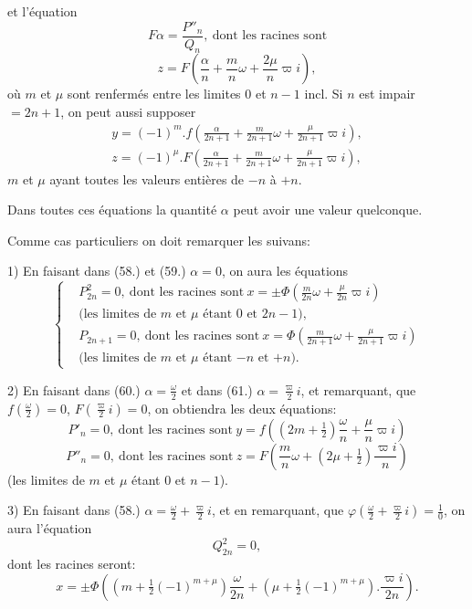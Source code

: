 \documentclass{article}
\begin{document}

et l'équation
\[ F\alpha=\frac{P''_n}{Q_n},\ \text{dont les racines sont} \]
\[ z=F\left(\frac{\alpha}{n}+\frac{m}{n}\omega+\frac{2\mu}{n}\varpi i\right), \tag{61.} \]
où $m$ et $\mu$ sont renfermés entre les limites 0 et $n-1$ incl. Si $n$ est impair $=2n+1$, on peut aussi supposer
\[ \begin{gathered} y=(-1)^{m}.f\left(\frac{\alpha}{2n+1}+\frac{m}{2n+1}\omega+\frac{\mu}{2n+1}\varpi i\right),\\ z=(-1)^{\mu}.F\left(\frac{\alpha}{2n+1}+\frac{m}{2n+1}\omega+\frac{\mu}{2n+1}\varpi i\right), \end{gathered} \]
$m$ et $\mu$ ayant toutes les valeurs entières de $-n$ à $+n$.

Dans toutes ces équations la quantité $\alpha$ peut avoir une valeur quelconque.

Comme cas particuliers on doit remarquer les suivans:

1) En faisant dans (58.) et (59.) $\alpha=0$, on aura les équations
\[ \left\{\begin{aligned} &P_{2n}^{2}=0,\ \text{dont les racines sont}\ x=\pm\Phi\left(\frac{m}{2n}\omega+\frac{\mu}{2n}\varpi i\right)\\ &\text{(les limites de $m$ et $\mu$ étant 0 et $2n-1$),}\\ &P_{2n+1}=0,\ \text{dont les racines sont}\ x=\Phi\left(\frac{m}{2n+1}\omega+\frac{\mu}{2n+1}\varpi i\right)\\ &\text{(les limites de $m$ et $\mu$ étant $-n$ et $+n$).} \end{aligned}\right. \tag{62.} \]

2) En faisant dans (60.) $\alpha=\frac{\omega}{2}$ et dans (61.) $\alpha=\frac{\varpi}{2}i$, et remarquant, que $f\left(\frac{\omega}{2}\right)=0$, $F\left(\frac{\varpi}{2}i\right)=0$, on obtiendra les deux équations:
\[ P'_n=0,\ \text{dont les racines sont}\ y=f\left((2m+\tfrac{1}{2})\frac{\omega}{n}+\frac{\mu}{n}\varpi i\right) \tag{63.} \]
\[ P''_n=0,\ \text{dont les racines sont}\ z=F\left(\frac{m}{n}\omega+(2\mu+\tfrac{1}{2})\frac{\varpi i}{n}\right) \tag{64.} \]
(les limites de $m$ et $\mu$ étant 0 et $n-1$).

3) En faisant dans (58.) $\alpha=\frac{\omega}{2}+\frac{\varpi}{2}i$, et en remarquant, que $\varphi\left(\frac{\omega}{2}+\frac{\varpi}{2}i\right)=\frac{1}{0}$, on aura l'équation
\[ Q_{2n}^{2}=0, \]
dont les racines seront:
\[ x=\pm\Phi\left((m+\tfrac{1}{2}(-1)^{m+\mu})\frac{\omega}{2n}+(\mu+\tfrac{1}{2}(-1)^{m+\mu}).\frac{\varpi i}{2n}\right). \]
\end{document}
